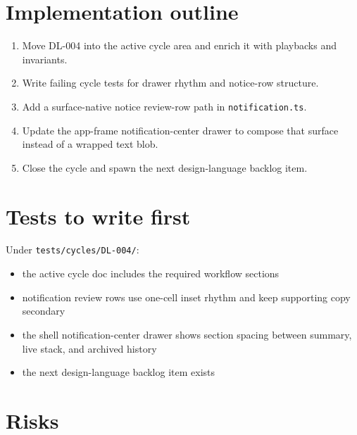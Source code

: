 \section{Implementation outline}\label{record-171-implementation-outline}

\begin{enumerate}
\def\labelenumi{\arabic{enumi}.}
\tightlist
\item
  Move DL-004 into the active cycle area and enrich it with playbacks and invariants.
\item
  Write failing cycle tests for drawer rhythm and notice-row structure.
\item
  Add a surface-native notice review-row path in \texttt{n\allowbreak{}o\allowbreak{}t\allowbreak{}i\allowbreak{}f\allowbreak{}i\allowbreak{}c\allowbreak{}a\allowbreak{}t\allowbreak{}i\allowbreak{}o\allowbreak{}n\allowbreak{}.\allowbreak{}t\allowbreak{}s}.
\item
  Update the app-frame notification-center drawer to compose that surface instead of a wrapped text blob.
\item
  Close the cycle and spawn the next design-language backlog item.
\end{enumerate}

\section{Tests to write first}\label{record-171-tests-to-write-first}

Under \texttt{t\allowbreak{}e\allowbreak{}s\allowbreak{}t\allowbreak{}s\allowbreak{}/\allowbreak{}c\allowbreak{}y\allowbreak{}c\allowbreak{}l\allowbreak{}e\allowbreak{}s\allowbreak{}/\allowbreak{}D\allowbreak{}L\allowbreak{}-\allowbreak{}0\allowbreak{}0\allowbreak{}4\allowbreak{}/}:

\begin{itemize}
\tightlist
\item
  the active cycle doc includes the required workflow sections
\item
  notification review rows use one-cell inset rhythm and keep supporting copy secondary
\item
  the shell notification-center drawer shows section spacing between summary, live stack, and archived history
\item
  the next design-language backlog item exists
\end{itemize}

\section{Risks}\label{record-171-risks}

